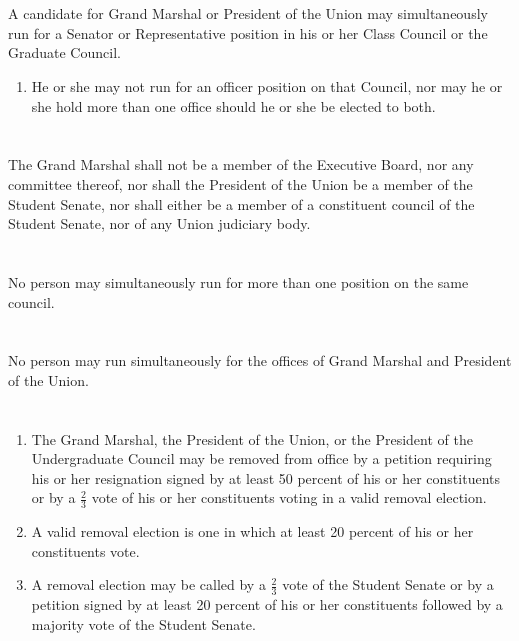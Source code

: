 \documentclass[12pt]{constitution}
\begin{document}
\section{}
A candidate for Grand Marshal or President of the Union may simultaneously run for a Senator or
Representative position in his or her Class Council or the Graduate Council.
\begin{enumerate}
\item He or she may not run for an officer position on that Council, nor may he or she hold more than one office should he or she be elected to both.
\end{enumerate}

\section{}
The Grand Marshal shall not be a member of the Executive Board, nor any committee thereof, nor shall the President of the Union be a member of the Student Senate, nor shall either be a member of a constituent council of the Student Senate, nor of any Union judiciary body.

\section{}
No person may simultaneously run for more than one position on the same council.

\section{}
No person may run simultaneously for the offices of Grand Marshal and President of the Union. 

\section{}
\begin{enumerate}
\item The Grand Marshal, the President of the Union, or the President of the Undergraduate Council
may be removed from office by a petition requiring his or her resignation signed by at least 50
percent of his or her constituents or by a $\frac{2}{3}$ vote of his or her constituents voting in a valid
removal election.
\item A valid removal election is one in which at least 20 percent of his or her constituents vote.
\item A removal election may be called by a $\frac{2}{3}$ vote of the Student Senate or by a petition signed by
at least 20 percent of his or her constituents followed by a majority vote of the Student Senate.
\end{enumerate}
\end{document}
